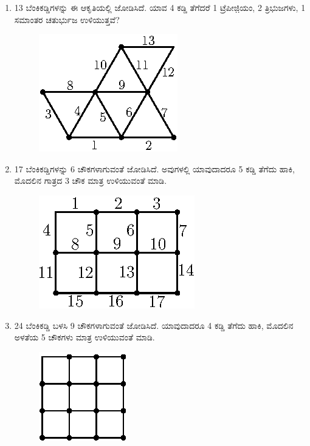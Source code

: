 \begin{enumerate}
\item 13 ಬೆಂಕಿಕಡ್ಡಿಗಳನ್ನು ಈ ಆಕೃತಿಯಲ್ಲಿ ಜೋಡಿಸಿದೆ. ಯಾವ 4 ಕಡ್ಡಿ ತೆಗೆದರೆ 1 ಟ್ರೆಪೀಜಿ಼ಯಂ, 2 ತ್ರಿಭುಜಗಳು, 1 ಸಮಾಂತರ ಚತುರ್ಭುಜ ಉಳಿಯುತ್ತವೆ?
\begin{figure}[H]
\centering
\includegraphics[scale=1.1]{images/chap3/q13.eps}
\end{figure}

\item 17 ಬೆಂಕಿಕಡ್ಡಿಗಳನ್ನು 6 ಚೌಕಗಳಾಗುವಂತೆ ಜೋಡಿಸಿದೆ. ಅವುಗಳಲ್ಲಿ ಯಾವುದಾದರೂ 5 ಕಡ್ಡಿ ತೆಗೆದು ಹಾಕಿ, ಮೊದಲಿನ  ಗಾತ್ರದ 3 ಚೌಕ ಮಾತ್ರ ಉಳಿಯುವಂತೆ ಮಾಡಿ.
\begin{figure}[H]
\centering
\includegraphics[scale=1.1]{images/chap3/q14.eps}
\end{figure}

\item 24 ಬೆಂಕಿಕಡ್ಡಿ ಬಳಸಿ 9 ಚೌಕಗಳಾಗುವಂತೆ ಜೋಡಿಸಿದೆ. ಯಾವುದಾದರೂ 4 ಕಡ್ಡಿ ತೆಗೆದು ಹಾಕಿ, ಮೊದಲಿನ ಅಳತೆಯ 5 ಚೌಕಗಳು ಮಾತ್ರ ಉಳಿಯುವಂತೆ ಮಾಡಿ.
\begin{figure}[H]
\centering
\includegraphics[scale=1.2]{images/chap3/q15.eps}
\end{figure}

\eject


\end{enumerate}
